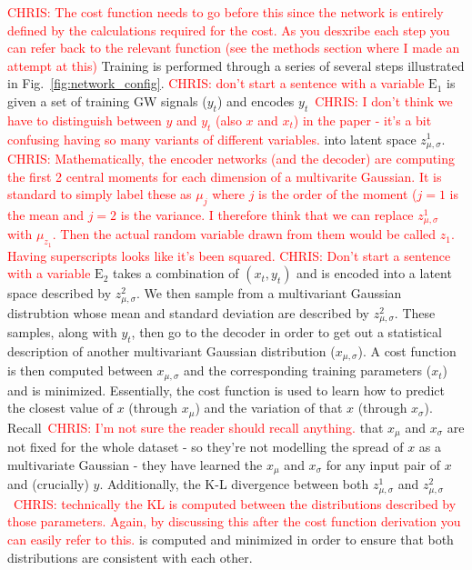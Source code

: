 \documentclass[%
showpacs,
 amsmath,amssymb,
 aps,
 twocolumn,
 prl,
 reprint,
floatfix,
]{revtex4-1}
\newcommand{\chris}[1]{\textcolor{red}{CHRIS: #1}}
\begin{document}
%
%
\chris{The cost function needs to go before this since the network is entirely
defined by the calculations required for the cost. As you desxribe each step
you can refer back to the relevant function (see the methods section where I
made an attempt at this)} Training is performed through a series of several
steps illustrated in Fig.~\ref{fig:network_config}. \chris{don't start a
sentence with a variable} $\textrm{E}_1$ is given a set of training \ac{GW}
signals ($y_t$) and encodes $y_t$~\chris{I don't think we have to distinguish
between $y$ and $y_t$ (also $x$ and $x_t$) in the paper - it's a bit confusing
having so many variants of different variables.} into latent space
$z^{1}_{\mu,\sigma}$.  \chris{Mathematically, the encoder networks (and the
decoder) are computing the first 2 central moments for each dimension of a
multivarite Gaussian. It is standard to simply label these as $\mu_{j}$ where
$j$ is the order of the moment ($j=1$ is the mean and $j=2$ is the variance. I
therefore think that we can replace $z^{1}_{\mu,\sigma}$ with $\mu_{z_{1}}$.
Then the actual random variable drawn from them would be called $z_{1}$. Having
superscripts looks like it's been squared.} \chris{Don't start a sentence with
a variable} $\textrm{E}_2$ takes a combination of $(x_{t},y_{t})$ and is
encoded into a latent space described by $z^{2}_{\mu,\sigma}$.  We then sample
from a multivariant Gaussian distrubtion whose mean and standard deviation are
described by $z^{2}_{\mu,\sigma}$. These samples, along with $y_t$, then go to
the decoder in order to get out a statistical description of another
multivariant Gaussian distribution ($x_{\mu,\sigma}$). A cost function is then
computed between $x_{\mu,\sigma}$ and the corresponding training parameters
($x_t$) and is minimized.  Essentially, the cost function is used to learn how
to predict the closest value of $x$ (through $x_{\mu}$) and the variation of
that $x$ (through $x_{\sigma}$). Recall~\chris{I'm not sure the reader should
recall anything.} that $x_{\mu}$ and $x_{\sigma}$ are not fixed for the whole
dataset - so they're not modelling the spread of $x$ as a multivariate Gaussian
- they have learned the $x_{\mu}$ and $x_{\sigma}$ for any input pair of $x$
  and (crucially) $y$. Additionally, the K-L divergence between both
$z^{1}_{\mu,\sigma}$ and $z^{2}_{\mu,\sigma}$~\chris{technically the KL is
computed between the distributions described by those parameters. Again, by
discussing this after the cost function derivation you can easily refer to
this.} is computed and minimized in order to ensure that both distributions are
consistent with each other.
\end{document}
